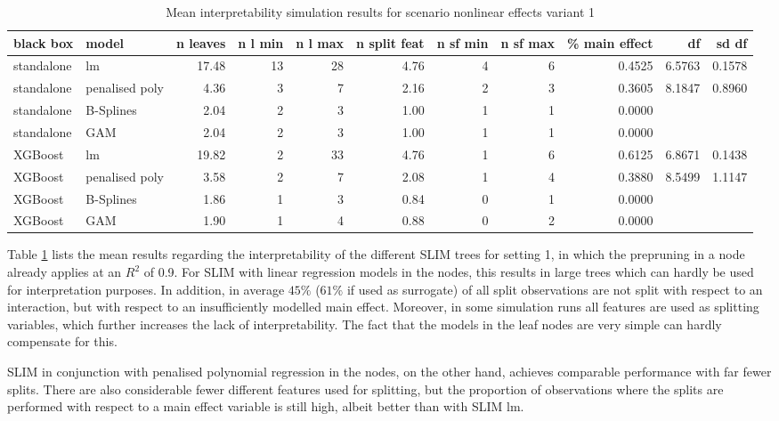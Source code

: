 \begin{table}[!htb]
\centering \tiny
\begin{tabular}[t]{l|l|r|r|r|r|r|r|r|r|r}
\hline
black box & model & n leaves & n l min & n l max & n split feat & n sf min & n sf max & \% main effect & df & sd df\\
\hline
standalone & lm & 17.48 & 13 & 28 & 4.76 & 4 & 6 & 0.4525 & 6.5763 & 0.1578\\
standalone & penalised poly & 4.36 & 3 & 7 & 2.16 & 2 & 3 & 0.3605 & 8.1847 & 0.8960\\
standalone & B-Splines & 2.04 & 2 & 3 & 1.00 & 1 & 1 & 0.0000 &  & \\
standalone & GAM & 2.04 & 2 & 3 & 1.00 & 1 & 1 & 0.0000 &  & \\
\hline
XGBoost & lm & 19.82 & 2 & 33 & 4.76 & 1 & 6 & 0.6125 & 6.8671 & 0.1438\\
XGBoost & penalised poly & 3.58 & 2 & 7 & 2.08 & 1 & 4 & 0.3880 & 8.5499 & 1.1147\\
XGBoost & B-Splines & 1.86 & 1 & 3 & 0.84 & 0 & 1 & 0.0000 &  & \\
XGBoost & GAM & 1.90 & 1 & 4 & 0.88 & 0 & 2 & 0.0000 &  & \\

\hline
\end{tabular}
\caption{Mean interpretability simulation results for scenario nonlinear effects variant 1}
\label{tab:linear_mixed_1_interpretability}

\end{table}

Table \ref{tab:linear_mixed_1_interpretability} lists the mean results regarding the interpretability of the different SLIM trees for setting 1, in which the prepruning in a node already applies at an $R^2$ of 0.9. For SLIM with linear regression models in the nodes, this results in large trees which can hardly be used for interpretation purposes.
In addition, in average $45\%$ ($61\%$ if used as surrogate) of all split observations are not split with respect to an interaction, but with respect to an insufficiently modelled main effect. Moreover, in some simulation runs all features are used as splitting variables, which further increases the lack of interpretability.
The fact that the models in the leaf nodes are very simple can hardly compensate for this. 

SLIM in conjunction with penalised polynomial regression in the nodes, on the other hand, achieves comparable performance with far fewer splits.
There are also considerable fewer different features used for splitting, but the proportion of observations where the splits are performed with respect to a main effect variable is still high, albeit better than with SLIM lm.

